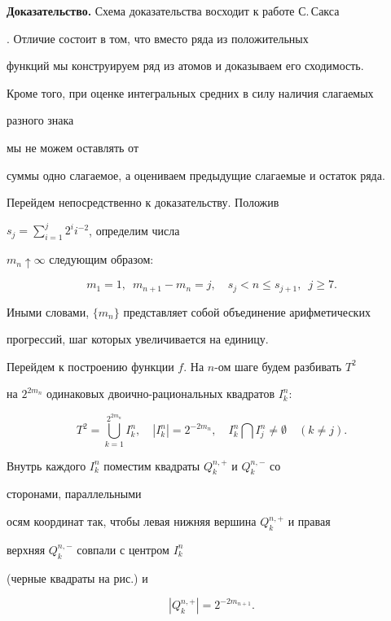 {\bf Доказательство.} Схема доказательства восходит к работе С.\,Сакса


\cite{S7}. Отличие состоит в том, что вместо ряда из положительных


функций мы конструируем ряд из атомов и доказываем его сходимость.


Кроме того, при оценке интегральных средних в силу наличия слагаемых


разного знака


мы не можем оставлять от


суммы одно слагаемое, а оцениваем предыдущие слагаемые и остаток ряда.





Перейдем непосредственно к доказательству. Положив


$s_j=\sum\limits^j_{i=1}2^i i^{-2}$, определим числа


$m_n\uparrow\infty$ следующим образом:


$$


m_1=1, \ \; m_{n+1}-m_n=j,\quad s_j<n\le s_{j+1},\ \;j\ge 7.


$$


Иными словами, $\{m_n\}$ представляет собой объединение арифметических


прогрессий, шаг которых увеличивается на единицу.





Перейдем к построению функции $f$. На $n$-ом шаге будем разбивать $T^2$


на $2^{2m_n}$ одинаковых двоично-рациональных квадратов $I^n_k$:


$$


T^2=\bigcup^{2^{2m_n}}_{k=1}I^n_k,\quad |I^n_k|=2^{-2m_n},\quad


I^n_k\bigcap I^n_j\ne\emptyset \quad(k\ne j).


$$


Внутрь каждого $I^n_k$ поместим квадраты $Q^{n,+}_k$ и $Q^{n,-}_k$ со


сторонами, параллельными


осям координат так, чтобы левая нижняя вершина $Q^{n,+}_k$ и правая


верхняя $Q^{n,-}_k$ совпали с центром $I^n_k$


(черные квадраты на рис.) и


\begin{equation}


|Q^{n,+}_k|=2^{-2m_{n+1}}.


\end{equation}


